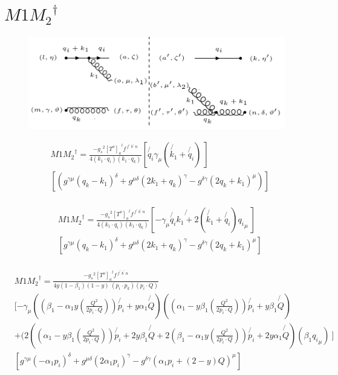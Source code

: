\pagebreak

\section{$ M1{M_2}^{\dagger} $}

\begin{figure}[ht!]
\centering
\includegraphics[scale=0.7]{images/GQ/M1M2DaggerGluon.png}
\end{figure}

\begin{equation}
\begin{split}
&M1{M_2}^{\dagger}=\frac{-{g_s}^2 {[T^{o}]_a}^{l} f^{\:f^{\prime}\: b^{\prime}\:n}}{4(k_1 \cdot q_i)(k_1 \cdot q_k)}[\not{q_i}{\gamma}_{\mu}(\not{k_1}+\not{q_i})\:]\\
&[ (g^{{{\gamma}}{{\mu}}}(q_k-k_1)^{\delta}+g^{{{\mu}}{{\delta}}}(2k_1 +q_k)^{{\gamma}}-g^{\delta{{\gamma}}}(2q_k+k_1)^{{\mu}})]\\
\end{split}
\end{equation}

\begin{equation}
\begin{split}
&M1{M_2}^{\dagger}=\frac{-{g_s}^2 {[T^{o}]_a}^{l} f^{\:f^{\prime}\: b^{\prime}\:n}}{4(k_1 \cdot q_i)(k_1 \cdot q_k)}[-\gamma_{\mu}\not{q_i}\not{k_1+2}(\not{k_1}+\not{q_i}){q_i}_{\mu}\:]\\
&[ g^{{{\gamma}}{{\mu}}}(q_k-k_1)^{\delta}+g^{{{\mu}}{{\delta}}}(2k_1+q_k )^{{\gamma}}-g^{\delta{{\gamma}}}(2q_k+k_1)^{{\mu}}]\\
\end{split}
\end{equation}

\begin{equation}
\begin{split}
&M1{M_2}^{\dagger}=\frac{-{g_s}^2 {[T^{o}]_a}^{l} f^{\:f^{\prime}\: b^{\prime}\:n}}{4 y(1-\beta_1) (1-y)\:(p_i \cdot p_k)(p_i \cdot Q)}\\
&[-\gamma_{\mu}((\beta_1 -\alpha_1 y(\frac{Q^2}{2p_i \cdot Q}))\not{p_i} + y\alpha_1\not{Q})((\alpha_1 -y\beta_1(\frac{Q^2}{2p_i \cdot Q})) \not{p_i} + y\beta_1\not{Q})\\
&+(2((\alpha_1 -y\beta_1(\frac{Q^2}{2p_i \cdot Q})) \not{p_i} + 2y\beta_1\not{Q}+2(\beta_1 -\alpha_1 y(\frac{Q^2}{2p_i \cdot Q}))\not{p_i} + 2y\alpha_1\not{Q})(\beta_1{q_i}_{\mu})\:]\\
&[ g^{{{\gamma}}{{\mu}}}(-\alpha_1p_i)^{\delta}+g^{{{\mu}}{{\delta}}}(2\alpha_1p_i )^{{\gamma}}-g^{\delta{{\gamma}}}(\alpha_1p_i+(2-y)Q)^{{\mu}}]\\
\end{split}
\end{equation}


